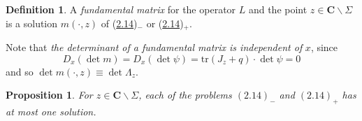 \documentclass{surv-l}
\theoremstyle{plain}
\newtheorem{prop}[theorem]{Proposition}
\theoremstyle{definition}
\newtheorem*{defi}{Definition}
\numberwithin{equation}{chapter}
\begin{document}
\begin{defi}
A \emph{fundamental matrix} for the operator $L$ and the point $ z\in \mathbf{C}\backslash \Sigma$ is a solution $m(\cdot,z)$ of (\hyperref[eq2.14-]{2.14})$_{-}$ or (\hyperref[eq2.14+]{2.14})$_{+}$.

Note that \emph{the determinant of a fundamental matrix is independent of} $x$, since
\begin{equation*}
D_{x}(\det m)=D_{x}(\det\psi)= \mathrm{tr} (J_{z}+q)\cdot \det\psi=0
\end{equation*}
    and so $\det m(\cdot, z)\equiv\det\Lambda_{z}$.
\end{defi}
\setcounter{theorem}{14}
\begin{prop}\label{prop2.15}
For $z\in \mathbf{C}\backslash \Sigma$,  each of the problems $(\hyperref[eq2.14-]{2.14})_{-}$ and $(\hyperref[eq2.14+]{2.14})_{+}$
has at most one solution.
\end{prop}
\end{document}
